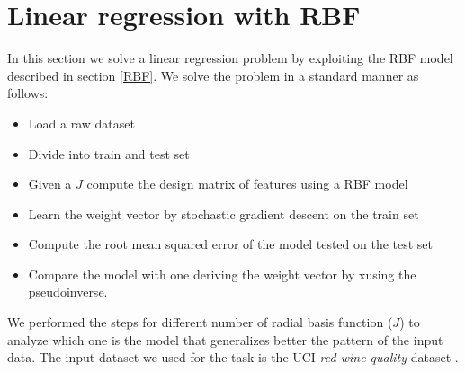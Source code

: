\documentclass[runningheads]{llncs}
\begin{document}
\section{Linear regression with RBF}
In this section we solve a linear regression problem by exploiting the
RBF model described in section \ref{RBF}. We solve the problem in a
standard manner as follows:
\begin{itemize}
\item Load a raw dataset
\item Divide into train and test set
\item Given a $J$ compute the design matrix of features using a RBF model
\item Learn the weight vector by stochastic gradient descent on the train set
\item Compute the root mean squared error of the model tested
  on the test set
\item Compare the model with one deriving the weight vector by xusing the
  pseudoinverse.
\end{itemize}
We performed the steps for different number of radial basis function
($J$) to analyze which one is the model that generalizes better the
pattern of the input data. The input dataset we used for the task is
the UCI \textit{red wine quality} dataset \cite{wine_data}.
\end{document}
